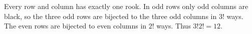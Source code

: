 Every row and column has exactly one rook. In odd rows only odd columns are black, so the three odd rows are bijected to the three odd columns in $3!$ ways. The even rows are bijected to even columns in $2!$ ways. Thus $\boxed{3!2!=12}$.
